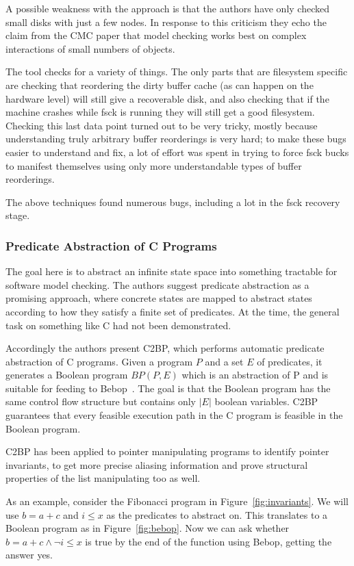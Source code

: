 \documentclass{article}
\begin{document}
\begin{multicols}{2}
A possible weakness with the approach is that the authors have only
checked small disks with just a few nodes.  In response to this
criticism they echo the claim from the CMC paper that model checking
works best on complex interactions of small numbers of objects.

The tool checks for a variety of things.  The only parts that are
filesystem specific are checking that reordering the dirty buffer
cache (as can happen on the hardware level) will still give a
recoverable disk, and also checking that if the machine crashes while
fsck is running they will still get a good filesystem.  Checking this
last data point turned out to be very tricky, mostly because
understanding truly arbitrary buffer reorderings is very hard; to make
these bugs easier to understand and fix, a lot of effort was spent in
trying to force fsck bucks to manifest themselves using only more
understandable types of buffer reorderings.

The above techniques found numerous bugs, including a lot in the fsck
recovery stage.

\subsubsection{Predicate Abstraction of C Programs~\cite{ball01automatic}}

The goal here is to abstract an infinite state space into something
tractable for software model checking.  The authors suggest predicate
abstraction as a promising approach, where concrete states are mapped
to abstract states according to how they satisfy a finite set of
predicates.  At the time, the general task on something like C had not
been demonstrated.

Accordingly the authors present C2BP, which performs automatic
predicate abstraction of C programs.  Given a program $P$ and a set
$E$ of predicates, it generates a Boolean program $BP(P, E)$ which is
an abstraction of P and is suitable for feeding to
Bebop~\cite{ball00bebop}.  The goal is that the Boolean program has
the same control flow structure but contains only $|E|$ boolean
variables.  C2BP guarantees that every feasible execution path in the
C program is feasible in the Boolean program.

C2BP has been applied to pointer manipulating programs to identify
pointer invariants, to get more precise aliasing information and prove
structural properties of the list manipulating too as well.

As an example, consider the Fibonacci program in
Figure~\ref{fig:invariants}.  We will use $b = a + c$ and $i \leq x$
as the predicates to abstract on.  This translates to a Boolean
program as in Figure~\ref{fig:bebop}.  Now we can ask whether $b = a +
c \wedge \neg i \leq x$ is true by the end of the function using
Bebop, getting the answer yes.


\end{multicols}
\end{document}
